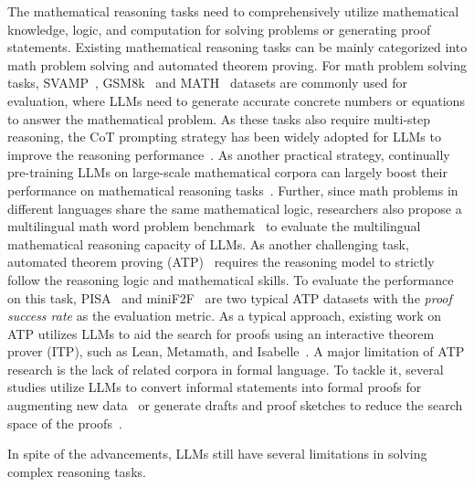 The mathematical reasoning tasks need to comprehensively utilize mathematical knowledge, logic, and computation for solving problems or generating proof statements. 
Existing mathematical reasoning tasks can be mainly categorized into math problem solving and automated theorem proving.  
{
For math problem solving tasks, SVAMP~\cite{Patel-NAACL-2021-Are}, GSM8k~\cite{Cobbe-arxiv-2021-Training} and MATH~\cite{Hendrycks-ICLR-2021-Measuring} datasets are commonly used for evaluation, where LLMs need to generate accurate concrete numbers or equations to answer the mathematical problem.
As these tasks also require multi-step reasoning, the CoT prompting strategy has been widely adopted for LLMs to improve the reasoning performance~\cite{Wei-arxiv-2022-chain}.
}
As another practical strategy, continually pre-training LLMs on large-scale mathematical corpora can largely boost their performance on  {mathematical reasoning tasks~\cite{Zhao-KDD-2022-JiuZhang,Taylor-arxiv-2022-Galactica,Lewkowycz-arxiv-2022-Solving}.}
Further, since math problems in different languages share the same mathematical logic, researchers also propose a multilingual math word problem benchmark~\cite{Shi-arxiv-2022-Language} to evaluate the multilingual mathematical reasoning capacity of LLMs.
 As another challenging task,  automated theorem proving (ATP)~\cite{Zheng-ICLR-2022-miniF2F,Welleck-NIPS-2021-NaturalProofs,Wang-CICM-2018-First} requires the reasoning model to strictly follow the reasoning logic and mathematical skills. %
{To evaluate the performance on this task, PISA~\cite{Jiang-AITP-2021-LISA} and miniF2F~\cite{Zheng-ICLR-2022-miniF2F} are two typical ATP datasets with the \emph{proof success rate} as the evaluation metric.}
As a typical approach, existing work on ATP utilizes LLMs to aid the search for proofs using an interactive theorem prover (ITP), such as Lean, Metamath, and Isabelle~\cite{Polu-arxiv-2020-Generative,Jiang-arxiv-2022-Thor,Polu-arxiv-2022-Formal}.  
{A major limitation of ATP research is the lack of related corpora in formal language. 
To tackle it, several studies utilize LLMs to convert informal statements into formal proofs for augmenting new data~\cite{Wu-arxiv-2022-Autoformalization} or generate drafts and proof sketches to} %
{reduce the search space of the proofs}~\cite{Jiang-arxiv-2022-Draft}.

In spite of the advancements, LLMs still have several limitations in solving complex reasoning tasks.

